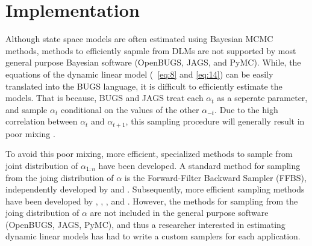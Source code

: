 \documentclass{article}
\DeclareMathOperator{\E}{E}
\begin{document}


%   

\section{Implementation}
\label{sec:implementation}


Although state space models are often estimated using Bayesian MCMC methods, methods to efficiently sapmle from DLMs are not supported by most general purpose Bayesian software (OpenBUGS, JAGS, and PyMC).
While, the  equations of the dynamic linear model (~\eqref{eq:8} and \eqref{eq:14}) can be easily translated into the BUGS language, it is difficult to efficiently estimate the models.
That is because, BUGS and JAGS treat each $\alpha_{t}$ as a seperate parameter, and sample $\alpha_{t}$ conditional on the values of the other $\alpha_{-t}$.
Due to the high correlation between $\alpha_{t}$ and $\alpha_{t+1}$, this sampling procedure will generally result in poor mixing \parencite[477]{Jackman2009}.

To avoid this poor mixing, more efficient, specialized methods to sample from joint distribution of $\alpha_{1:n}$ have been developed.
A standard method for sampling from the joing distribution of $\alpha$ is the Forward-Filter Backward Sampler (FFBS), independently developed by \textcite{CarterKohn1994} and \textcite{Fruehwirth-Schnatter1994}.
Subsequently, more efficient sampling methods have been developed by \textcite{DeJongShephard1995}, \textcite{DurbinKoopman2002}, \textcite{StricklandTurnerDenhamEtAl2009}, and \textcite{ChanJeliazkov2009}.
However, the methods for sampling from the joing distribution of $\alpha$ are not included in the general purpose software (OpenBUGS, JAGS, PyMC), and thus a researcher interested in estimating dynamic linear models has had to write a custom samplers for each application.
\end{document}
